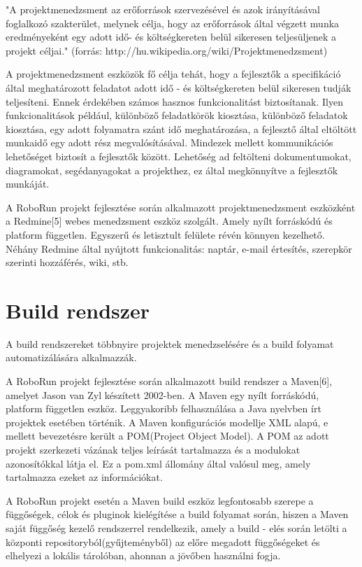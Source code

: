 "A projektmenedzsment az erőforrások szervezésével és azok irányításával foglalkozó szakterület, melynek célja, hogy az erőforrások által végzett munka eredményeként egy adott idő- és költségkereten belül sikeresen teljesüljenek a projekt céljai." (forrás: http://hu.wikipedia.org/wiki/Projektmenedzsment)

	A projektmenedzsment eszközök fő célja tehát, hogy a fejlesztők a specifikáció által meghatározott feladatot adott idő - és költségkereten belül sikeresen tudják teljesíteni. Ennek érdekében számos hasznos funkcionalitást biztosítanak. Ilyen funkcionalitások például, különböző feladatkörök kiosztása, különböző feladatok kiosztása, egy adott folyamatra szánt idő meghatározása, a fejlesztő által eltöltött munkaidő egy adott rész megvalósításával. Mindezek mellett kommunikációs lehetőséget biztosít a fejlesztők között. Lehetőség ad feltölteni dokumentumokat, diagramokat, segédanyagokat a projekthez, ez által megkönnyítve a fejlesztők munkáját.
	
	A RoboRun projekt fejlesztése során alkalmazott projektmenedzsment eszközként a Redmine[5] webes menedzsment eszköz szolgált. Amely nyílt forráskódú és platform független. Egyszerű és letisztult felülete révén könnyen kezelhető. Néhány Redmine által nyújtott funkcionalitás: naptár, e-mail értesítés, szerepkör szerinti hozzáférés, wiki, stb.



\section{Build rendszer}

A build rendszereket többnyire projektek menedzselésére és a build folyamat automatizálására alkalmazzák. 

	A RoboRun projekt fejlesztése során alkalmazott build rendszer a Maven[6], amelyet Jason van Zyl készített 2002-ben. A Maven egy nyílt forráskódú, platform független eszköz. Leggyakoribb felhasználása a Java nyelvben írt projektek esetében történik. A Maven konfigurációs modellje XML alapú, e mellett bevezetésre került a POM(Project Object Model). A POM az adott projekt szerkezeti vázának teljes leírását tartalmazza és a modulokat azonosítókkal látja el.  Ez a pom.xml állomány által valósul meg, amely tartalmazza ezeket az információkat. 
	
	A RoboRun projekt esetén a Maven build eszköz legfontosabb szerepe a függőségek, célok és pluginok kielégítése a build folyamat során, hiszen a Maven saját függőség kezelő rendszerrel rendelkezik, amely  a build - elés során letölti a központi repositoryból(gyűjteményből) az előre megadott függőségeket és elhelyezi a lokális tárolóban, ahonnan a jövőben használni fogja.

